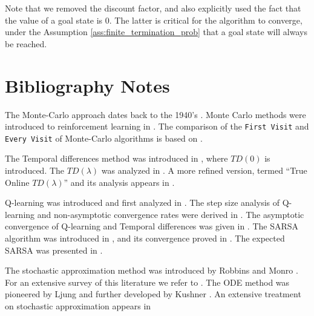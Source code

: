 Note that we removed the discount factor, and also explicitly used the fact that the value of a goal state is $0$. The latter is critical for the algorithm to converge, under the Assumption \ref{ass:finite_termination_prob} that a goal state will always be reached.

\section{Bibliography Notes}

The Monte-Carlo approach dates back to the 1940's \cite{MetropolisU49}. Monte Carlo methods were introduced to reinforcement learning in \cite{BartoD93}.
The comparison of the {\tt First Visit} and {\tt Every Visit} of Monte-Carlo algorithms is
based on \cite{SinghS96}.

The Temporal differences method was introduced in \cite{Sutton88}, where $TD(0)$ is introduced. The $TD(\lambda)$ was analyzed in \cite{Dayan92,DayanS94}. A more refined version, termed ``True Online $TD(\lambda)$'' and its analysis appears in \cite{SeijenS14,SeijenMPMS16}.

Q-learning was introduced and first analyzed in \cite{WatkinsD92}.
The step size analysis of Q-learning and non-asymptotic convergence rates were derived in \cite{Even-DarM03}.
The asymptotic convergence of Q-learning and Temporal differences was given in \cite{JaakkolaJS94,Tsitsiklis94}.
The SARSA algorithm was introduced in \cite{rummery1994line,SinghS96}, and its convergence proved in \cite{SinghJLS00}. 
The expected SARSA was presented in \cite{SeijenHWW09}.



The stochastic approximation method was introduced by Robbins and  Monro \cite{RobbinsS51}. 
For an extensive survey of this literature we refer to \citep{kushner2003stochastic}.
The ODE method was pioneered by Ljung \cite{Ljung77,LjungS83} and further developed by Kushner \cite{KushnerC78,Kushner84}. An extensive treatment on stochastic approximation appears in \cite{kushner2003stochastic,benveniste2012adaptive,borkar2009stochastic}












